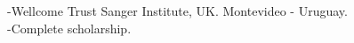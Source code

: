 \documentclass[margin,line]{res}
\newenvironment{list2}{
  \begin{list}{$\bullet$}{%
      \setlength{\itemsep}{0in}
      \setlength{\parsep}{0in} \setlength{\parskip}{0in}
      \setlength{\topsep}{0in} \setlength{\partopsep}{0in}
      \setlength{\leftmargin}{0.2in}}}{\end{list}}
\begin{document}
\begin{resume}
-Wellcome Trust Sanger Institute, UK. Montevideo - Uruguay.\\
-Complete scholarship.\\[4pt]

\end{resume}
\end{document}
